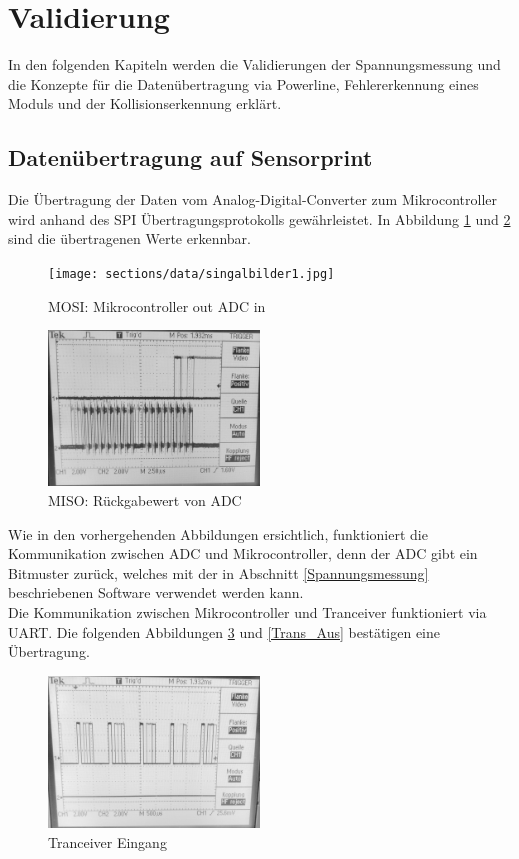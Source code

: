 \section{Validierung}
In den folgenden Kapiteln werden die Validierungen der Spannungsmessung und die Konzepte für die Datenübertragung via Powerline, Fehlererkennung eines Moduls und der Kollisionserkennung erklärt.
\subsection{Datenübertragung auf Sensorprint}
Die Übertragung der Daten vom Analog-Digital-Converter zum Mikrocontroller wird anhand des SPI Übertragungsprotokolls gewährleistet. In Abbildung \ref{SPI_MOSI} und \ref{SPI_MISO} sind die übertragenen Werte erkennbar. 
\begin{figure}[htb]
\centering
\texttt{[image: sections/data/singalbilder1.jpg]}
\caption{MOSI: Mikrocontroller out ADC in}
\label{SPI_MOSI}
\end{figure}

\begin{figure}[htb]
\centering
\includegraphics[width=0.5\textwidth]{sections/data/singalbilder3.jpg}
\caption{MISO: Rückgabewert von ADC}
\label{SPI_MISO}
\end{figure}

Wie in den vorhergehenden Abbildungen ersichtlich, funktioniert die Kommunikation zwischen ADC und Mikrocontroller, denn der ADC gibt ein Bitmuster zurück, welches mit der in Abschnitt \ref{Spannungsmessung} beschriebenen Software verwendet werden kann. \\
\newpage
Die Kommunikation zwischen Mikrocontroller und Tranceiver funktioniert via UART. Die folgenden Abbildungen \ref{Trans_Ein} und \ref{Trans_Aus} bestätigen eine Übertragung.
\begin{figure}[htb]
\centering
\includegraphics[width=0.5\textwidth]{sections/data/singalbilder8.jpg}
\caption{Tranceiver Eingang}
\label{Trans_Ein}
\end{figure}

